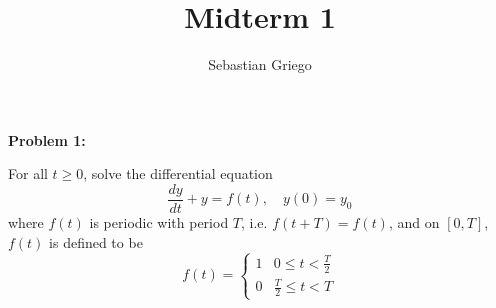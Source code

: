 \documentclass[12pt]{article}
\newenvironment{problem}[1]{
    \textbf{Problem #1:}
}{
    \rmfamily \vspace{2em}
}
\begin{document}
\title{Midterm 1}  %
\author{Sebastian Griego}  %
\maketitle

\begin{problem}{1}
    For all \(t \geq 0\), solve the differential equation
    \[
        \frac{dy}{dt} + y = f(t), \quad y(0) = y_0
    \]
    where \(f(t)\) is periodic with period \(T \), i.e. \(f(t+T) = f(t)\), and on \([0,T]\), \(f(t)\) is defined to be
    \[
        f(t) = \begin{cases} 
            1 & 0 \leq t < \frac{T}{2} \\
            0 & \frac{T}{2} \leq t < T
        \end{cases}
    \]
\end{problem}
\end{document}
